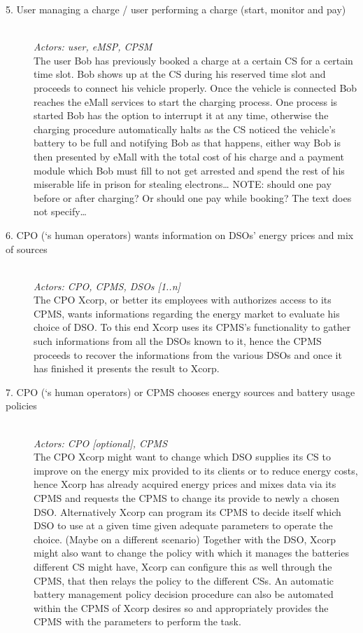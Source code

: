 \documentclass[11pt]{article}
\begin{document}
\begin{description}
    \item [5. User managing a charge / user performing a charge (start, monitor and pay)] \hfill \\
        \textit{Actors: user, eMSP, CPSM} \\
        The user Bob has previously booked a charge at a certain CS for a certain time slot. Bob shows up at the CS during his reserved time slot and proceeds to connect his vehicle properly. Once the vehicle is connected Bob reaches the eMall services to start the charging process. One process is started Bob has the option to interrupt it at any time, otherwise the charging procedure automatically halts as the CS noticed the vehicle’s battery to be full and notifying Bob as that happens, either way Bob is then presented by eMall with the total cost of his charge and a payment module which Bob must fill to not get arrested and spend the rest of his miserable life in prison for stealing electrons…
        NOTE: should one pay before or after charging? Or should one pay while booking? The text does not specify…
    \item [6. CPO (‘s human operators) wants information on DSOs’ energy prices and mix of sources] \hfill \\
        \textit{Actors: CPO, CPMS, DSOs [1..n]} \\
        The CPO Xcorp, or better its employees with authorizes access to its CPMS, wants informations regarding the energy market to evaluate his choice of DSO. To this end Xcorp uses its CPMS’s functionality to gather such informations from all the DSOs known to it, hence the CPMS proceeds to recover the informations from the various DSOs and once it has finished it presents the result to Xcorp.
    \item [7. CPO (‘s human operators) or CPMS chooses energy sources and battery usage policies] \hfill \\
        \textit{Actors: CPO [optional], CPMS} \\
        The CPO Xcorp might want to change which DSO supplies its CS to improve on the energy mix provided to its clients or to reduce energy costs, hence Xcorp has already acquired energy prices and mixes data via its CPMS and requests the CPMS to change its provide to newly a chosen DSO.
        Alternatively Xcorp can program its CPMS to decide itself which DSO to use at a given time given adequate parameters to operate the choice.
        (Maybe on a different scenario)
        Together with the DSO, Xcorp might also want to change the policy with which it manages the batteries different CS might have, Xcorp can configure this as well through the CPMS, that then relays the policy to the different CSs. An automatic battery management policy decision procedure can also be automated within the CPMS of Xcorp desires so and appropriately provides the CPMS with the parameters to perform the task.
\end{description}
\end{document}
